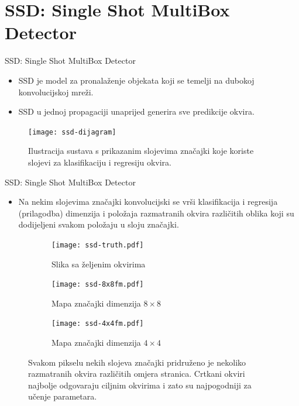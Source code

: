\documentclass{beamer}
\begin{document}
\section{SSD: Single Shot MultiBox Detector}

\begin{frame}{SSD: Single Shot MultiBox Detector}
	\begin{itemize}
		\item SSD je model za pronalaženje objekata koji se temelji na dubokoj konvolucijskoj mreži.
		\item SSD u jednoj propagaciji unaprijed generira sve predikcije okvira.
	\end{itemize}
	\begin{figure}[ht] \centering 
		\texttt{[image: ssd-dijagram]}
		\caption{Ilustracija sustava s prikazanim slojevima značajki koje koriste slojevi za klasifikaciju i regresiju okvira.}
		\label{fig:arhitektura}
	\end{figure}
\end{frame}

\begin{frame}{SSD: Single Shot MultiBox Detector}
	\begin{itemize}
		\item Na nekim slojevima značajki konvolucijski se vrši klasifikacija i regresija (prilagodba) dimenzija i položaja razmatranih okvira različitih oblika koji su dodijeljeni svakom položaju u sloju značajki.
	\end{itemize}
	\begin{figure}[ht] \centering
		\begin{subfigure}[b]{0.32\textwidth} \centering
			\texttt{[image: ssd-truth.pdf]}
			\caption{Slika sa željenim okvirima}
		\end{subfigure}
		\begin{subfigure}[b]{0.32\textwidth} \centering
			\texttt{[image: ssd-8x8fm.pdf]}
			\caption{Mapa značajki dimenzija $8\times8$}
		\end{subfigure}
		\begin{subfigure}[b]{0.32\textwidth} \centering
			\texttt{[image: ssd-4x4fm.pdf]}
			\caption{Mapa značajki dimenzija $4\times4$}
		\end{subfigure}
		\caption{Svakom pikselu nekih slojeva značajki pridruženo je nekoliko razmatranih okvira različitih omjera stranica. Crtkani okviri najbolje odgovaraju ciljnim okvirima i zato su najpogodniji za učenje parametara.}
	\end{figure}
\end{frame}
\end{document}
